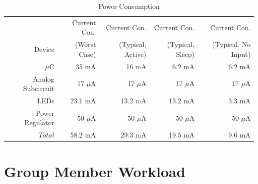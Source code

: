 \documentclass[12pt]{article}
\begin{document}
\clearpage

\begin{table}[!h]
   \centering
    \begin{tabular}{|r|r|r|r|r|}
        \hline
         & Current Con.& Current Con.& Current Con. & Current Con. \\
        Device & (Worst Case)& (Typical, Active)& (Typical, Sleep) & (Typical, No Input) \\ \hline
       $\mu$C & 35 mA & 16 mA & 6.2 mA & 6.2 mA \\ \hline
       Analog Subcircuit & 17 $\mu$A & 17 $\mu$A & 17 $\mu$A & 17 $\mu$A \\ \hline
       LEDs & 23.1 mA & 13.2 mA & 13.2 mA & 3.3 mA \\ \hline
       Power Regulator & 50 $\mu$A & 50 $\mu$A & 50 $\mu$A & 50 $\mu$A \\ \hline 
       $Total$ & 58.2 mA & 29.3 mA & 19.5 mA & 9.6 mA\\ \hline 
    \end{tabular}
	\caption{Power Consumption}
	\label{Power} 
\end{table}


\section{Group Member Workload}
\end{document}
